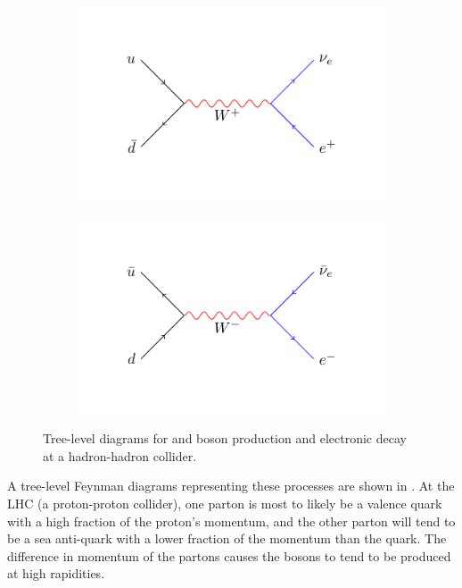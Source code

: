 \begin{figure}[htbp]
  \centering
  \begin{subfigure}{0.45\textwidth}
    \centering
    \includegraphics[width=\textwidth]{w_process_wp}
    \caption{\HepProcess{\Pup + \APdown \to \PWp \to \Pleptonplus \Pnulepton}}
    \label{fig:w_process_wp}
  \end{subfigure}
  \begin{subfigure}{0.45\textwidth}
    \centering
    \includegraphics[width=\textwidth]{w_process_wm}
    \caption{\HepProcess{\APup + \Pdown \to \PWm \to \Pleptonminus \APnulepton}}
    \label{fig:w_process_wm}
  \end{subfigure}
  \caption{Tree-level diagrams for \PWp and \PWm boson production and electronic
decay at a hadron-hadron collider.}\label{fig:w_process} 
\end{figure}

A tree-level Feynman diagrams representing these processes are shown in
.
At the \ac{LHC} (a proton-proton collider), one parton is most to likely be a
valence quark with a high fraction of the proton's momentum, and the other
parton will tend to be a sea anti-quark with a lower fraction of the momentum
than the quark. The difference in momentum of the partons causes the \PW bosons 
to tend to be produced at high rapidities. 

